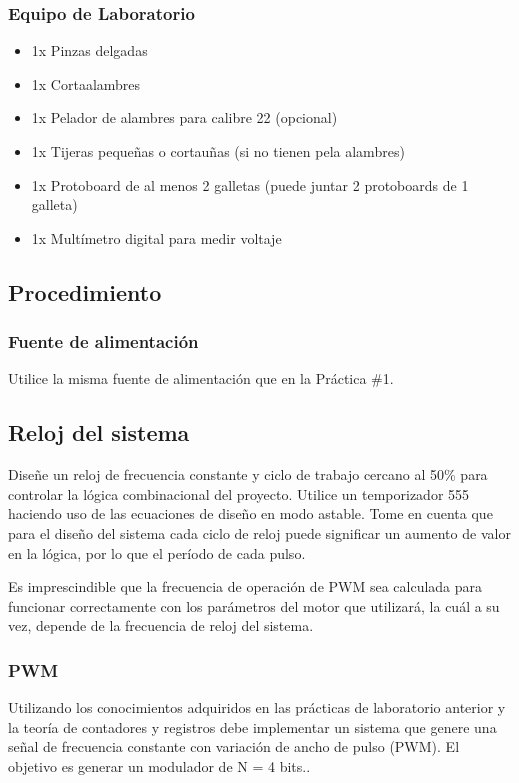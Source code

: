 \subsubsection*{Equipo de Laboratorio}
\begin{itemize}
    \item 1x Pinzas delgadas
    \item 1x Cortaalambres
    \item 1x Pelador de alambres para calibre 22 (opcional)
    \item 1x Tijeras pequeñas o cortauñas (si no tienen pela alambres)
    \item 1x Protoboard de al menos 2 galletas (puede juntar 2 protoboards de 1 galleta)
    \item 1x Multímetro digital para medir voltaje
\end{itemize}

\subsection{Procedimiento}
\subsubsection{Fuente de alimentación}
Utilice la misma fuente de alimentación que en la Práctica \#1.

\subsection{Reloj del sistema}
Diseñe un reloj de frecuencia constante y ciclo de trabajo cercano al 50\% para controlar la lógica combinacional del proyecto. Utilice un temporizador 555 haciendo uso de las 
ecuaciones de diseño en modo astable. Tome en cuenta que para el diseño del sistema cada ciclo de reloj puede significar un aumento de valor en la lógica, por lo que el período de cada pulso.

Es imprescindible que la frecuencia de operación de PWM sea calculada para funcionar correctamente con los parámetros del motor que utilizará, la cuál a su vez, 
depende de la frecuencia de reloj del sistema.

\subsubsection{PWM}
Utilizando los conocimientos adquiridos en las prácticas de laboratorio anterior y la teoría de contadores y registros debe implementar un sistema que 
genere una señal de frecuencia constante con variación de ancho de pulso (PWM). El objetivo es generar un modulador de N = 4 bits..


